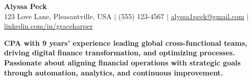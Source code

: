 \documentclass[10pt,a4paper]{article}
\begin{document}
\vspace*{-1.2cm}
\begin{center}
    {\LARGE \textbf{Alyssa Peck}} \\
    123 Love Lane, Pleasantville, USA $\vert$ (555) 123-4567 $\vert$ \href{mailto:alyssa1peck@gmail.com}{alyssa1peck@gmail.com} $\vert$ \href{https://linkedin.com/in/graceharper}{linkedin.com/in/graceharper}
\end{center}
\vspace{-0.5em}

\textbf{CPA with 9 years' experience leading global cross-functional teams, driving digital finance transformation, and optimizing processes. Passionate about aligning financial operations with strategic goals through automation, analytics, and continuous improvement.}
\vspace{0.5em}

\end{document}
